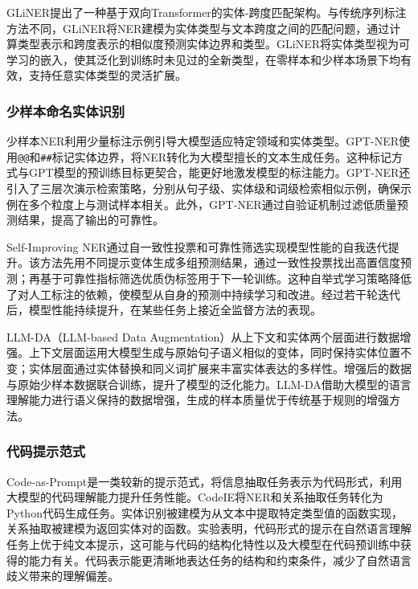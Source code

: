 GLiNER提出了一种基于双向Transformer的实体-跨度匹配架构\cite{gliner_2023}。与传统序列标注方法不同，GLiNER将NER建模为实体类型与文本跨度之间的匹配问题，通过计算类型表示和跨度表示的相似度预测实体边界和类型。GLiNER将实体类型视为可学习的嵌入，使其泛化到训练时未见过的全新类型，在零样本和少样本场景下均有效，支持任意实体类型的灵活扩展。

\subsubsection{少样本命名实体识别}

少样本NER利用少量标注示例引导大模型适应特定领域和实体类型。GPT-NER\cite{gpt_ner_2023}使用\texttt{@@}和\texttt{\#\#}标记实体边界，将NER转化为大模型擅长的文本生成任务。这种标记方式与GPT模型的预训练目标更契合，能更好地激发模型的标注能力。GPT-NER还引入了三层次演示检索策略，分别从句子级、实体级和词级检索相似示例，确保示例在多个粒度上与测试样本相关。此外，GPT-NER通过自验证机制过滤低质量预测结果，提高了输出的可靠性。

Self-Improving NER\cite{self_improving_ner_2023}通过自一致性投票和可靠性筛选实现模型性能的自我迭代提升。该方法先用不同提示变体生成多组预测结果，通过一致性投票找出高置信度预测；再基于可靠性指标筛选优质伪标签用于下一轮训练。这种自举式学习策略降低了对人工标注的依赖，使模型从自身的预测中持续学习和改进。经过若干轮迭代后，模型性能持续提升，在某些任务上接近全监督方法的表现。

LLM-DA（LLM-based Data Augmentation）从上下文和实体两个层面进行数据增强\cite{llm_da_2024}。上下文层面运用大模型生成与原始句子语义相似的变体，同时保持实体位置不变；实体层面通过实体替换和同义词扩展来丰富实体表达的多样性。增强后的数据与原始少样本数据联合训练，提升了模型的泛化能力。LLM-DA借助大模型的语言理解能力进行语义保持的数据增强，生成的样本质量优于传统基于规则的增强方法。

\subsubsection{代码提示范式}

Code-as-Prompt是一类较新的提示范式，将信息抽取任务表示为代码形式，利用大模型的代码理解能力提升任务性能。CodeIE\cite{codeie_2023}将NER和关系抽取任务转化为Python代码生成任务。实体识别被建模为从文本中提取特定类型值的函数实现，关系抽取被建模为返回实体对的函数。实验表明，代码形式的提示在自然语言理解任务上优于纯文本提示，这可能与代码的结构化特性以及大模型在代码预训练中获得的能力有关。代码表示能更清晰地表达任务的结构和约束条件，减少了自然语言歧义带来的理解偏差。

